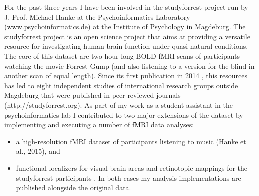 %
For the past three years I have been involved in the studyforrest project run by
J.-Prof. Michael Hanke at the Psychoinformatics Laboratory
(www.psychoinformatics.de) at the Institute of Psychology in Magdeburg.
%
The
studyforrest project is an open science project that aims at providing a
versatile resource for investigating human brain function under quasi-natural
conditions.
%
The core of this dataset are two hour long BOLD fMRI scans of
participants watching the movie Forrest Gump (and also listening to a version
for the blind in another scan of equal length).
%
Since its first publication in
2014 \citep{hanke2014audiomovie}, this resources has led to eight independent studies
of international research groups outside Magdeburg that were published in
peer-reviewed journals (http://studyforrest.org).
%
As part of my work as a
student assistant in the psychoinformatics lab I contributed to two major
extensions of the dataset by implementing and executing a number of fMRI data
analyses:
\begin{itemize}
    \item a high-resolution fMRI dataset of participants listening to music
    (Hanke et al., 2015), and
    \item functional localizers for visual brain areas and
        retinotopic mappings for the studyforrest participants
        \citep{sengupta2016extension}. In both cases my analysis
        implementations are published alongside the original data.
\end{itemize}


